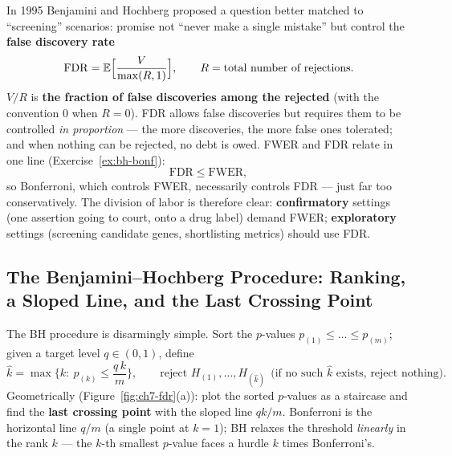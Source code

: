 In 1995 Benjamini and Hochberg proposed a question better matched to ``screening'' scenarios\cite{benjamini1995}: promise not ``never make a single mistake'' but control the \textbf{false discovery rate}
\begin{equation}\label{eq:fdr-def}
  \mathrm{FDR} = \mathbb{E}\Big[ \frac{V}{\max(R, 1)} \Big],
  \qquad R = \text{total number of rejections}.
\end{equation}
$V/R$ is \textbf{the fraction of false discoveries among the rejected} (with the convention $0$ when $R = 0$). FDR allows false discoveries but requires them to be controlled \emph{in proportion} — the more discoveries, the more false ones tolerated; and when nothing can be rejected, no debt is owed. FWER and FDR relate in one line (Exercise~\ref{ex:bh-bonf}):
\[
  \mathrm{FDR} \le \mathrm{FWER},
\]
so Bonferroni, which controls FWER, necessarily controls FDR — just far too conservatively. The division of labor is therefore clear: \textbf{confirmatory} settings (one assertion going to court, onto a drug label) demand FWER; \textbf{exploratory} settings (screening candidate genes, shortlisting metrics) should use FDR.

\subsection[The Benjamini--Hochberg Procedure: Ranking, a Sloped Line, and the Last Crossing Point]{The Benjamini--Hochberg Procedure: Ranking, a Sloped Line, and the Last Crossing Point}\label{sec:bh}

The BH procedure is disarmingly simple. Sort the $p$-values $p_{(1)} \le \dots \le p_{(m)}$; given a target level $q \in (0, 1)$, define
\begin{equation}\label{eq:bh}
  \hat{k} = \max\Big\{ k :\ p_{(k)} \le \frac{q\, k}{m} \Big\},
  \qquad
  \text{reject } H_{(1)}, \dots, H_{(\hat{k})}
  \ \ \text{(if no such $\hat{k}$ exists, reject nothing).}
\end{equation}
Geometrically (Figure~\ref{fig:ch7-fdr}(a)): plot the sorted $p$-values as a staircase and find the \textbf{last crossing point} with the sloped line $qk/m$. Bonferroni is the horizontal line $q/m$ (a single point at $k=1$); BH relaxes the threshold \emph{linearly} in the rank $k$ — the $k$-th smallest $p$-value faces a hurdle $k$ times Bonferroni's.


